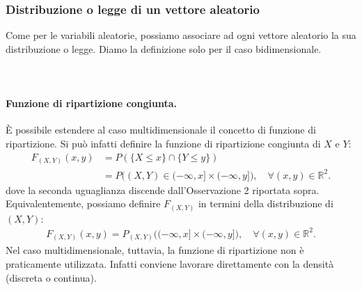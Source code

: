 \documentclass[a4paper,12pt]{article}
\begin{document}
\subsubsection{Distribuzione o legge di un vettore aleatorio}
Come per le variabili aleatorie, possiamo associare ad ogni vettore aleatorio la sua distribuzione o legge. Diamo la definizione solo per il caso bidimensionale.\\
\\
\vspace{1px}\\
\paragraph{Funzione di ripartizione congiunta.}
È possibile estendere al caso multidimensionale il concetto di funzione di ripartizione. 
Si può infatti definire la funzione di ripartizione congiunta di $X$ e $Y$:
\begin{align*}
F_{(X,Y)}(x, y) &= P(\{X \leq x\} \cap \{Y \leq y\}) \\
&= P\big((X, Y) \in (-\infty, x] \times (-\infty, y]\big), \quad \forall (x, y) \in \mathbb{R}^2.
\end{align*}
dove la seconda uguaglianza discende dall’Osservazione 2 riportata sopra. Equivalentemente, 
possiamo definire $F_{(X,Y)}$ in termini della distribuzione di $(X, Y)$:
\begin{align*}
F_{(X,Y)}(x, y) = P_{(X,Y)}\big((-\infty, x] \times (-\infty, y]\big), \quad \forall (x, y) \in \mathbb{R}^2.
\end{align*}
Nel caso multidimensionale, tuttavia, la funzione di ripartizione non è praticamente 
utilizzata. Infatti conviene lavorare direttamente con la densità (discreta o continua).
\end{document}
